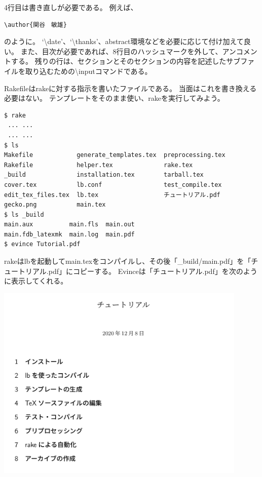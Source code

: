 4行目は書き直しが必要である。
例えば、
\begin{verbatim}
\author{関谷　敏雄}
\end{verbatim}
のように。
`{\textbackslash}date'、`{\textbackslash}thanks'、abstract環境などを必要に応じて付け加えて良い。
また、目次が必要であれば、8行目のハッシュマークを外して、アンコメントする。
残りの行は、セクションとそのセクションの内容を記述したサブファイルを取り込むための{\textbackslash}inputコマンドである。

Rakefileはrakeに対する指示を書いたファイルである。
当面はこれを書き換える必要はない。
テンプレートをそのまま使い、rakeを実行してみよう。
\begin{verbatim}
$ rake
 ... ...
 ... ...
$ ls
Makefile            generate_templates.tex  preprocessing.tex
Rakefile            helper.tex              rake.tex
_build              installation.tex        tarball.tex
cover.tex           lb.conf                 test_compile.tex
edit_tex_files.tex  lb.tex                  チュートリアル.pdf
gecko.png           main.tex
$ ls _build
main.aux          main.fls  main.out
main.fdb_latexmk  main.log  main.pdf
$ evince Tutorial.pdf
\end{verbatim}
rakeはlbを起動してmain.texをコンパイルし、その後「\_build/main.pdf」を「チュートリアル.pdf」にコピーする。
Evinceは「チュートリアル.pdf」を次のように表示してくれる。
\begin{center}
\includegraphics[width=12cm]{Tutorial_1.png}
\end{center}

